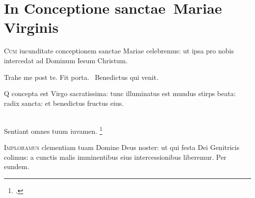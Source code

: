 \chapter{In Conceptione sanctae~Mariae Virginis}

\lettrine{C}{um} iucunditate conceptionem sanctae Mariae celebremus:
ut ipsa pro nobis intercedat ad Dominum Iesum Christum.

Trahe me post te.
Fit porta.
~Benedictus qui venit.

\lettrine{Q}{} concepta est Virgo sacratissima:
tunc illuminatus est mundus
stirps beata: radix sancta: et benedictus fructus eius.

\\ %
Sentiant omnes tuum iuvamen.
\footcite[cf.][De BMV, f. 6v]{diu1523}

\lettrine{I}{mploramus} clementiam tuam Domine Deus noster:
ut qui festa Dei Genitricis colimus:
a cunctis malis imminentibus eius intercessionibus liberemur.
Per eundem.

\headingCantus


